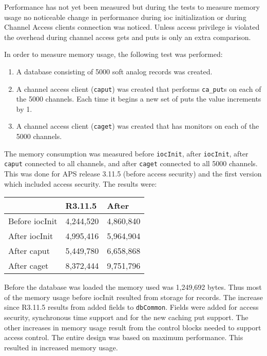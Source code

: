 Performance has not yet been measured but during the tests to measure memory usage no noticeable change in 
performance during ioc initialization or during Channel Access clients connection was noticed. Unless access privilege is 
violated the overhead during channel access gets and puts is only an extra comparison.

In order to measure memory usage, the following test was performed:

\begin{enumerate}
\item A database consisting of 5000 soft analog records was created.

\item A channel access client (\verb|caput|) was created that performs \verb|ca_put|s on each of the 5000 channels. Each time it 
begins a new set of puts the value increments by 1.

\item A channel access client (\verb|caget|) was created that has monitors on each of the 5000 channels.

\end{enumerate}

The memory consumption was measured before \verb|iocInit|, after \verb|iocInit|, after \verb|caput| connected to all channels, and 
after \verb|caget| connected to all 5000 channels. This was done for APS release 3.11.5 (before access security) and the first 
version which included access security. The results were:
\begin{center}
\begin{longtable}{p{1.0in}p{1.0in}p{1.0in}}
\textbf{} & \textbf{R3.11.5} & \textbf{After}\\
\hline
Before iocInit & 4,244,520 & 4,860,840\\
After iocInit & 4,995,416 & 5,964,904\\
After caput & 5,449,780 & 6,658,868\\
After caget & 8,372,444 & 9,751,796
\end{longtable}

\end{center}


Before the database was loaded the memory used was 1,249,692 bytes. Thus most of the memory usage before iocInit 
resulted from storage for records. The increase since R3.11.5 results from added fields to \verb|dbCommon|. Fields were added 
for access security, synchronous time support and for the new caching put support. The other increases in memory usage 
result from the control blocks needed to support access control. The entire design was based on maximum performance. 
This resulted in increased memory usage.

